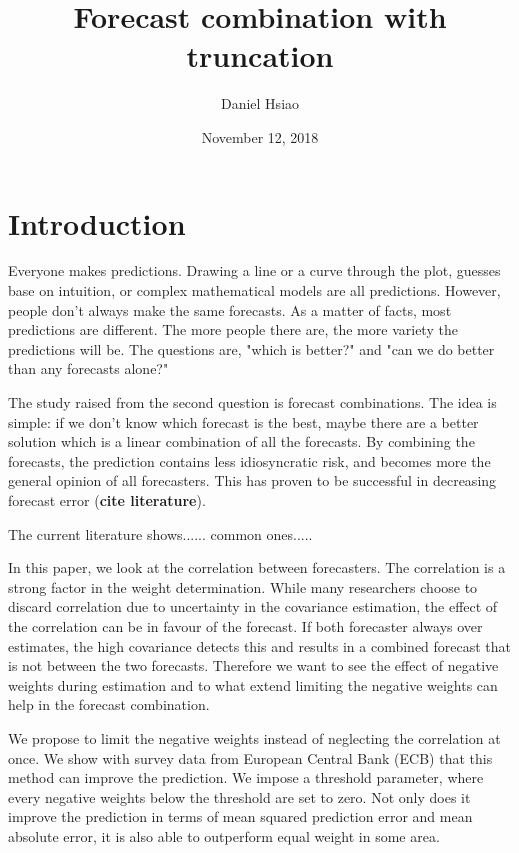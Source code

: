\documentclass[11pt]{article}
\title{Forecast combination with truncation}
\author{Daniel Hsiao}
\date{November 12, 2018}
\begin{document}
\maketitle
\newpage
{
\setcounter{tocdepth}{3}
\tableofcontents
}
\newpage

\section{Introduction}\label{introduction}
Everyone makes predictions. Drawing a line or a curve through the plot, guesses base on intuition, or complex mathematical models are all predictions. However, people don't always make the same forecasts. As a matter of facts, most predictions are different. The more people there are, the more variety the predictions will be. The questions are, "which is better?" and "can we do better than any forecasts alone?"

The study raised from the second question is forecast combinations. The idea is simple: if we don't know which forecast is the best, maybe there are a better solution which is a linear combination of all the forecasts. By combining the forecasts, the prediction contains less idiosyncratic risk, and becomes more the general opinion of all forecasters. This has proven to be successful in decreasing forecast error (\textbf{cite literature}).

The current literature shows......
common ones.....

In this paper, we look at the correlation between forecasters. The correlation is a strong factor in the weight determination. While many researchers choose to discard correlation due to uncertainty in the covariance estimation, the effect of the correlation can be in favour of the forecast. If both forecaster always over estimates, the high covariance detects this and results in a combined forecast that is not between the two forecasts. Therefore we want to see the effect of negative weights during estimation and to what extend limiting the negative weights can help in the forecast combination.

We propose to limit the negative weights instead of neglecting the correlation at once. We show with survey data from European Central Bank (ECB) that this method can improve the prediction. We impose a threshold parameter, where every negative weights below the threshold are set to zero. Not only does it improve the prediction in terms of mean squared prediction error and mean absolute error, it is also able to outperform equal weight in some area.
 
\end{document}
